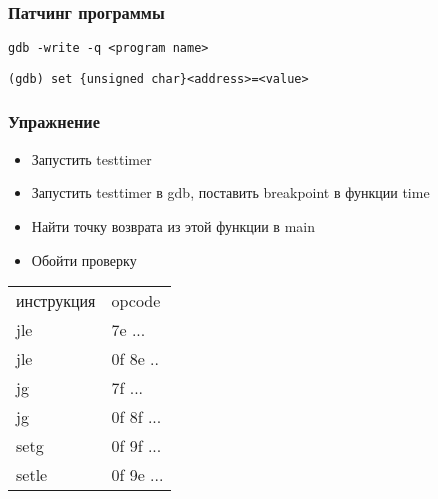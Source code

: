 \begin{frame}[fragile]
  \frametitle{Патчинг программы}
  \begin{verbatim}
gdb -write -q <program name>
  \end{verbatim}
\pause
\vspace{2ex}
  \begin{verbatim}
(gdb) set {unsigned char}<address>=<value>
  \end{verbatim}
\end{frame}

\begin{frame}
  \frametitle{Упражнение}
  \begin{itemize}
    \item Запустить testtimer
    \item Запустить testtimer в gdb, поставить breakpoint в функции time
    \item Найти точку возврата из этой функции в main
    \item Обойти проверку
  \end{itemize}
  \begin{tabular}{ll}
    инструкция & opcode \\
    jle        & 7e ... \\
    jle        & 0f 8e .. \\
    jg         & 7f ... \\
    jg         & 0f 8f ...\\
    setg       & 0f 9f ... \\
    setle      & 0f 9e ... \\
  \end{tabular}
\end{frame}




